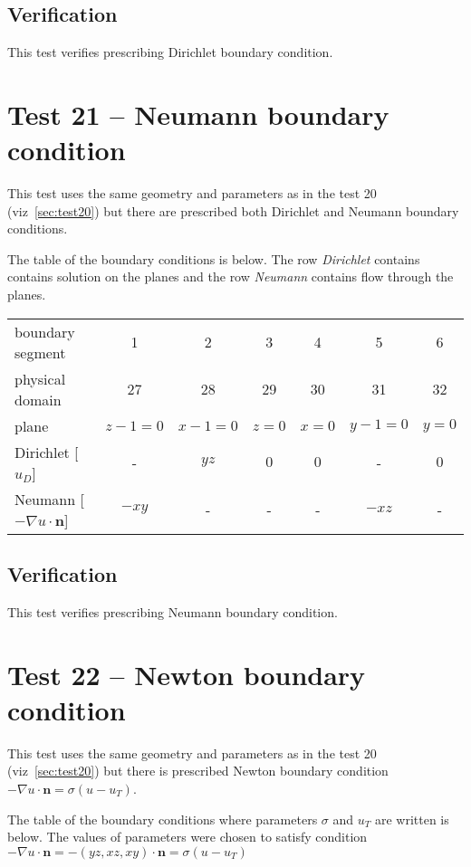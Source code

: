 \subsection*{Verification}
This test verifies prescribing Dirichlet boundary condition.


\section{Test 21 -- Neumann boundary condition}
\label{sec:test21}
This test uses the same geometry and parameters as in the test 20 (viz~\ref{sec:test20}) but there are prescribed both Dirichlet and Neumann boundary conditions. 

The table of the boundary conditions is below. The row \emph{Dirichlet} contains contains solution on the planes and the row \emph{Neumann} contains flow through the planes.

\begin{center}
  \begin{tabular}{|l|c|c|c|c|c|c|}
      \hline
      boundary segment & 1 & 2 & 3 & 4 & 5 & 6 \\ 
      physical domain & 27 & 28 & 29 & 30 & 31 & 32 \\ 
      plane & $z-1=0$  & $x-1=0$ & $z=0$ & $x=0$ & $y-1=0$& $y=0$\\
      Dirichlet [$u_D$] 
	  &   -   & $yz$ & $0$ & $0$ &   -   & $0$\\
      Neumann [$-\nabla{}u\cdot{}\mathbf{n}$] 
	  & $-xy$ &   -  &  -  &  -  & $-xz$ & - \\
      \hline
  \end{tabular}
\end{center}

\subsection*{Verification}
This test verifies prescribing Neumann boundary condition.

\section{Test 22 -- Newton boundary condition}
\label{sec:test21}
This test uses the same geometry and parameters as in the test 20 (viz~\ref{sec:test20}) but there is prescribed Newton boundary condition $-\nabla{}u\cdot{}\mathbf{n} = \sigma(u-u_T)$.

The table of the boundary conditions where parameters $\sigma$ and $u_T$ are written is below. The values of parameters were chosen to satisfy condition $-\nabla{}u\cdot{}\mathbf{n} = -(yz,xz,xy)\cdot\mathbf{n} = \sigma(u-u_T)$


